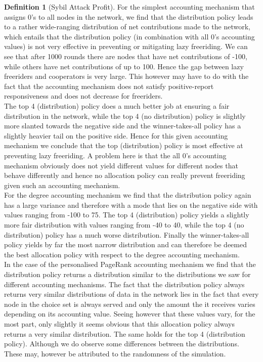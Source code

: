 \documentclass[11pt,a4paper]{article}
\theoremstyle{definition}
\newtheorem{definition}{Definition}[section]
\theoremstyle{theorem}
\theoremstyle{proposition}
\theoremstyle{corollary}
\theoremstyle{lemma}
\theoremstyle{example}
\theoremstyle{remark}
\begin{document}
\begin{definition}[Sybil Attack Profit]
\noindent{}For the simplest accounting mechanism that assigns $0$'s to all nodes in the network, we find that the distribution policy leads to a rather wide-ranging distribution of net contributions made to the network, which entails that the distribution policy (in combination with all $0$'s accounting values) is not very effective in preventing or mitigating lazy freeriding. We can see that after 1000 rounds there are nodes that have net contributions of -100, while others have net contributions of up to 100. Hence the gap between lazy freeriders and cooperators is very large. This however may have to do with the fact that the accounting mechanism does not satisfy positive-report responsiveness and does not decrease for freeriders. \vspace{1em}\\

\noindent{}The top 4 (distribution) policy does a much better job at ensuring a fair distribution in the network, while the top 4 (no distribution) policy is slightly more slanted towards the negative side and the winner-takes-all policy has a slightly heavier tail on the positive side. Hence for this given accounting mechanism we conclude that the top (distribution) policy is most effective at preventing lazy freeriding. A problem here is that the all $0$'s accounting mechanism obviously does not yield different values for different nodes that behave differently and hence no allocation policy can really prevent freeriding given such an accounting mechanism. \vspace{1em}\\

\noindent{}For the degree accounting mechanism we find that the distribution policy again has a large variance and therefore with a mode that lies on the negative side with values ranging from -100 to 75. The top 4 (distribution) policy yields a slightly more fair distribution with values ranging from -40 to 40, while the top 4 (no distribution) policy has a much worse distribution. Finally the winner-takes-all policy yields by far the most narrow distribution and can therefore be deemed the best allocation policy with respect to the degree accounting mechanism.\vspace{1em}\\

\noindent{}In the case of the personalised PageRank accounting mechanism we find that the distribution policy returns a distribution similar to the distributions we saw for different accounting mechanisms. The fact that the distribution policy always returns very similar distributions of data in the network lies in the fact that every node in the choice set is always served and only the amount the it receives varies depending on its accounting value. Seeing however that these values vary, for the most part, only slightly it seems obvious that this allocation policy always returns a very similar distribution. The same holds for the top 4 (distribution policy). Although we do observe some differences between the distributions. These may, however be attributed to the randomness of the simulation.\vspace{1em}\\


\end{definition}
\end{document}
